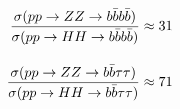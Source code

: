 \begin{equation*}
  \begin{split}
    \frac{\sigma(pp\rightarrow ZZ\rightarrow b\bar{b}b\bar{b})  }{\sigma(pp\rightarrow HH\rightarrow b\bar{b}b\bar{b})  } &\approx 31 \\[10pt]
    \frac{\sigma(pp\rightarrow ZZ\rightarrow b\bar{b}\tau\tau)}{\sigma(pp\rightarrow HH\rightarrow b\bar{b}\tau\tau)} &\approx 71
  \end{split}
\end{equation*}







